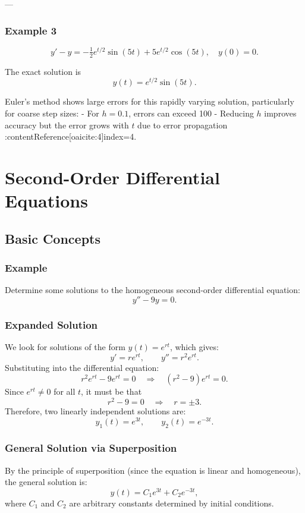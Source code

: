 \documentclass[12pt]{book}
\begin{document}
---

\subsection*{Example 3}

\[
y' - y = -\tfrac12 e^{t/2} \sin(5t) + 5 e^{t/2} \cos(5t), \quad y(0) = 0.
\]

The exact solution is
\[
y(t) = e^{t/2} \sin(5t).
\]

Euler’s method shows large errors for this rapidly varying solution, particularly for coarse step sizes:
- For \(h=0.1\), errors can exceed 100%
- Reducing \(h\) improves accuracy but the error grows with \(t\) due to error propagation :contentReference[oaicite:4]{index=4}.


\chapter{Second-Order Differential Equations}
\section{Basic Concepts}

\subsection*{Example}
Determine some solutions to the homogeneous second-order differential equation:
\[
y'' - 9y = 0.
\]

\subsection*{Expanded Solution}
We look for solutions of the form \(y(t) = e^{rt}\), which gives:
\[
y' = r e^{rt}, 
\qquad 
y'' = r^2 e^{rt}.
\]
Substituting into the differential equation:
\[
r^2 e^{rt} - 9 e^{rt} = 0
\quad\Longrightarrow\quad
(r^2 - 9)e^{rt} = 0.
\]
Since \(e^{rt} \neq 0\) for all \(t\), it must be that
\[
r^2 - 9 = 0 \quad\Longrightarrow\quad r = \pm 3.
\]
Therefore, two linearly independent solutions are:
\[
y_1(t) = e^{3t},
\qquad
y_2(t) = e^{-3t}.
\]

\subsection*{General Solution via Superposition}
By the principle of superposition (since the equation is linear and homogeneous), the general solution is:
\[
y(t) = C_1 e^{3t} + C_2 e^{-3t},
\]
where \(C_1\) and \(C_2\) are arbitrary constants determined by initial conditions.
\end{document}
